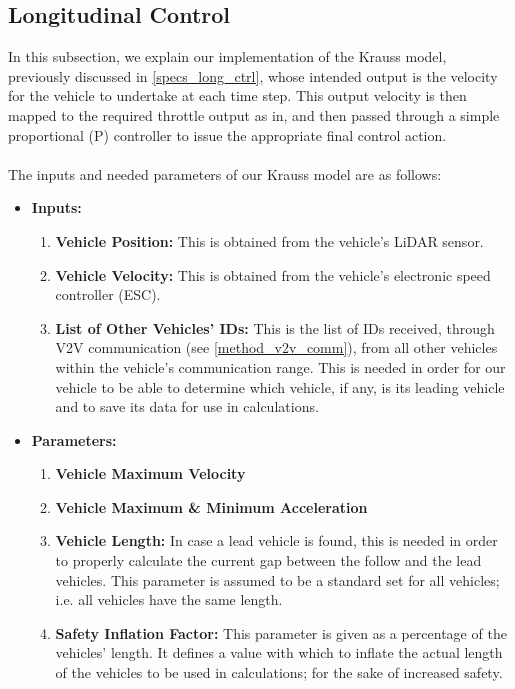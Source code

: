 \subsection{Longitudinal Control}
\label{method_long_ctrl}
In this subsection, we explain our implementation of the Krauss model, previously discussed in \ref{specs_long_ctrl}, whose intended output is the velocity for the vehicle to undertake at each time step. This output velocity is then mapped to the required throttle output as in\cite{f110-fall2018-skeletons}, and then passed through a simple proportional (P) controller to issue the appropriate final control action. \\ \\
The inputs and needed parameters of our Krauss model are as follows:

\begin{itemize}
    \item \textbf{Inputs:}
        \begin{enumerate}
            \item \textbf{Vehicle Position:} This is obtained from the vehicle’s LiDAR sensor.
            \item \textbf{Vehicle Velocity:} This is obtained from the vehicle’s electronic speed controller (ESC).
            \item \textbf{List of Other Vehicles’ IDs:} This is the list of  IDs received, through V2V communication (see \ref{method_v2v_comm}), from all other vehicles within the vehicle’s communication range. This is needed in order for our vehicle to be able to determine which vehicle, if any, is its leading vehicle and to save its data for use in calculations.
        \end{enumerate}
    \item \textbf{Parameters:}
        \begin{enumerate}
            \item \textbf{Vehicle Maximum Velocity}
            \item \textbf{Vehicle Maximum \& Minimum Acceleration}
            \item \textbf{Vehicle Length:} In case a lead vehicle is found, this is needed in order to properly calculate the current gap between the follow and the lead vehicles. This parameter is assumed to be a standard set for all vehicles; i.e. all vehicles have the same length.
            \item \textbf{Safety Inflation Factor:} This parameter is given as a percentage of the vehicles’ length. It defines a value with which to inflate the actual length of the vehicles to be used in calculations; for the sake of increased safety. 

\end{enumerate}
\end{itemize}
